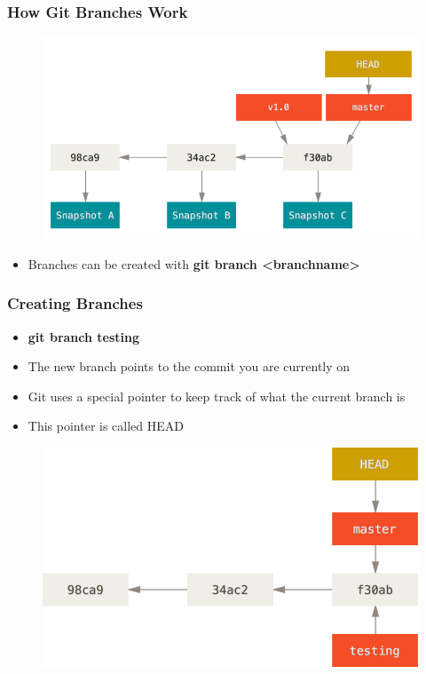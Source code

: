 \documentclass{beamer}
\begin{document}
\begin{frame}
	\frametitle{How Git Branches Work}
	\begin{figure}
		\includegraphics[scale=0.30]{How_Git_Branches_Work-1.png}
	\end{figure}
	\begin{itemize}
		\item{Branches can be created with \textbf{git branch \textless{}branchname\textgreater{}}}
	\end{itemize}
\end{frame}

\begin{frame}
	\frametitle{Creating Branches}
	\begin{itemize}
		\item{\textbf{git branch testing}}
		\item{The new branch points to the commit you are currently on}
		\item{Git uses a special pointer to keep track of what the current branch is}
		\item{This pointer is called HEAD}
	\end{itemize}
	\begin{figure}
		\includegraphics[scale=0.32]{Creating_Branches-1.png}
	\end{figure}
\end{frame}
\end{document}
